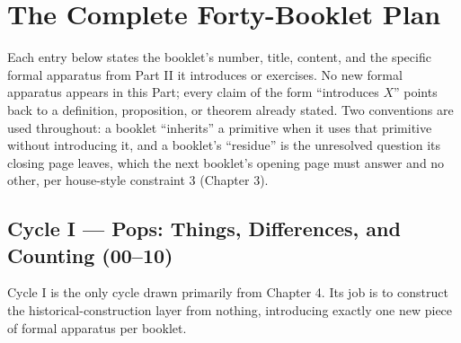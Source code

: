\documentclass[11pt,twoside]{book}
\begin{document}
\part{The Complete Forty-Booklet Plan}

Each entry below states the booklet's number, title, content, and the specific formal apparatus from Part II it introduces or exercises. No new formal apparatus appears in this Part; every claim of the form ``introduces $X$'' points back to a definition, proposition, or theorem already stated. Two conventions are used throughout: a booklet ``inherits'' a primitive when it uses that primitive without introducing it, and a booklet's ``residue'' is the unresolved question its closing page leaves, which the next booklet's opening page must answer and no other, per house-style constraint 3 (Chapter 3).

\chapter{Cycle I --- Pops: Things, Differences, and Counting (00--10)}

Cycle I is the only cycle drawn primarily from Chapter 4. Its job is to construct the historical-construction layer from nothing, introducing exactly one new piece of formal apparatus per booklet.
\end{document}
